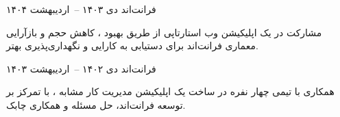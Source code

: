 \begin{cventries}
\cventry
{فرانت‌اند}
{\href{https://tourino.app/}{}}
{}
{دی ۱۴۰۳ --\ اردیبهشت ۱۴۰۴}
{
	\begin{cvitems}
    \item {مشارکت در یک اپلیکیشن وب استارتاپی از طریق بهبود ، کاهش حجم  و بازآرایی معماری فرانت‌اند برای دستیابی به کارایی و نگهداری‌پذیری بهتر.}
		\item {}
    \item {}
  \end{cvitems}
}

\cventry
{فرانت‌اند}
{\href{https://quera.org/}{}}
{}
{دی ۱۴۰۲ --\ اردیبهشت ۱۴۰۳}
{
	\begin{cvitems}
    \item {همکاری با تیمی چهار نفره در ساخت یک اپلیکیشن مدیریت کار مشابه ، با تمرکز بر توسعه فرانت‌اند، حل مسئله و همکاری چابک.}
    \item {}
    \item {}
  \end{cvitems}
}

\end{cventries}

